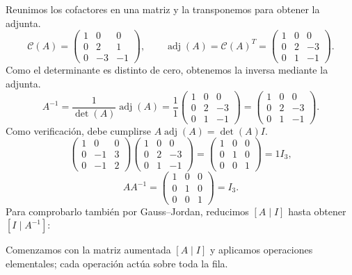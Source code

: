 \documentclass[12pt]{article}
\theoremstyle{remark}
\newcommand{\adj}{\operatorname{adj}}
\begin{document}
Reunimos los cofactores en una matriz y la transponemos para obtener la adjunta.
\[
\mathcal{C}(A)=\begin{pmatrix}1&0&0\\0&2&1\\0&-3&-1\end{pmatrix},\qquad\adj(A)=\mathcal{C}(A)^T=\begin{pmatrix}1&0&0\\0&2&-3\\0&1&-1\end{pmatrix}.
\]
Como el determinante es distinto de cero, obtenemos la inversa mediante la adjunta.
\[
A^{-1}=\frac1{\det(A)}\adj(A)=\frac1{1}\begin{pmatrix}1&0&0\\0&2&-3\\0&1&-1\end{pmatrix}=\begin{pmatrix}1&0&0\\0&2&-3\\0&1&-1\end{pmatrix}.
\]
Como verificación, debe cumplirse $A\adj(A)=\det(A)I$.
\[
\begin{pmatrix}1&0&0\\0&-1&3\\0&-1&2\end{pmatrix}\begin{pmatrix}1&0&0\\0&2&-3\\0&1&-1\end{pmatrix}=\begin{pmatrix}1&0&0\\0&1&0\\0&0&1\end{pmatrix}=1I_{3},
\]
\[
AA^{-1}=\begin{pmatrix}1&0&0\\0&1&0\\0&0&1\end{pmatrix}=I_{3}.
\]
Para comprobarlo también por Gauss--Jordan, reducimos $[A\mid I]$ hasta obtener $[I\mid A^{-1}]$:

Comenzamos con la matriz aumentada $[A\mid I]$ y aplicamos operaciones elementales; cada operación actúa sobre toda la fila.
\end{document}
